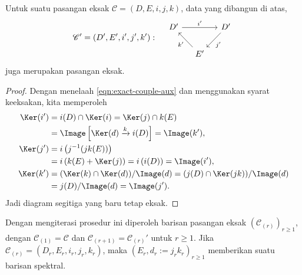 \begin{lemma}
	Untuk suatu pasangan eksak $\mathscr{C}=(D,E,i,j,k)$, data yang dibangun di
	atas,
	\[ \mathscr{C}'=(D',E',i',j',k'):\quad
	\begin{tikzcd}[column sep=small]
		D' \arrow[rr, "{i'}"] & & D' \arrow[ld, "{j'}"] \\
		& E' \arrow[lu, "{k'}"] &
	\end{tikzcd} \]
	juga merupakan pasangan eksak.
\end{lemma}
\begin{proof}
	Dengan menelaah \eqref{eqn:exact-couple-aux} dan menggunakan syarat
	keeksakan, kita memperoleh
	\begin{align*}
		\Ker(i') &= i(D)\cap\Ker(i)=\Ker(j)\cap k(E) \\
		&=\Image\left[\Ker(d)\xrightarrow{k}i(D)\right]=\Image(k'), \\
		\Ker(j') &= i\left(j^{-1}(jk(E))\right) \\
		&=i\left(k(E)+\Ker(j)\right)=i\left(i(D)\right)=\Image(i'), \\
		\Ker(k') &= (\Ker(k)\cap\Ker(d))/\Image(d)
		=(j(D)\cap\Ker(jk))/\Image(d) \\
		&=j(D)/\Image(d)=\Image(j').
	\end{align*}
	Jadi diagram segitiga yang baru tetap eksak.
\end{proof}

Dengan mengiterasi prosedur ini diperoleh barisan pasangan eksak
$(\mathscr{C}_{(r)})_{r\geq1}$, dengan
$\mathscr{C}_{(1)}=\mathscr{C}$ dan
$\mathscr{C}_{(r+1)}=\mathscr{C}_{(r)}'$ untuk $r\geq1$. Jika
$\mathscr{C}_{(r)}=(D_r,E_r,i_r,j_r,k_r)$, maka
$(E_r,d_r:=j_rk_r)_{r\geq1}$ memberikan suatu barisan spektral.

